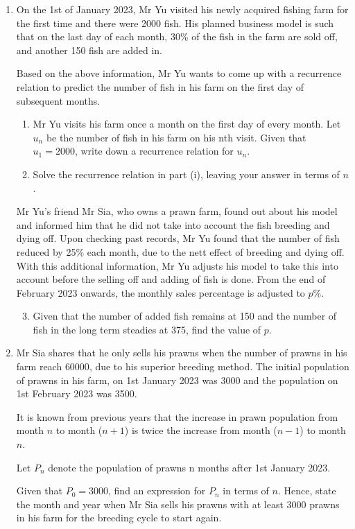 \documentclass{echw}
\begin{document}
    \problem{}
        \begin{enumerate}
            \item On the 1st of January 2023, Mr Yu visited his newly acquired fishing farm for the first time and there were 2000 fish. His planned business model is such that on the last day of
            each month, 30\% of the fish in the farm are sold off, and another 150 fish are added in.

            Based on the above information, Mr Yu wants to come up with a recurrence relation to predict the number of fish in his farm on the first day of subsequent months.

            \begin{enumerate}
                \item Mr Yu visits his farm once a month on the first day of every month. Let $u_n$ be the number of fish in his farm on his nth visit. Given that $u_1 = 2000$, write down a recurrence relation for $u_n$.
                \item Solve the recurrence relation in part (i), leaving your answer in terms of $n$.
            \end{enumerate}

            Mr Yu's friend Mr Sia, who owns a prawn farm, found out about his model and informed him that he did not take into account the fish breeding and dying off. Upon checking past records, Mr Yu found that the number of fish reduced by 25\% each month, due to the nett effect of breeding and dying off. With this additional information, Mr Yu adjusts his model to take this into account before the selling off and adding of fish is done. From the end of February 2023 onwards, the monthly sales percentage is adjusted to $p$\%.

            \begin{enumerate}
                \setcounter{enumii}{2}
                \item Given that the number of added fish remains at 150 and the number of fish in the long term steadies at 375, find the value of $p$.
            \end{enumerate}

            \item Mr Sia shares that he only sells his prawns when the number of prawns in his farm reach $60000$, due to his superior breeding method. The initial population of prawns in his farm, on 1st January 2023 was 3000 and the population on 1st February 2023 was 3500.
            
            It is known from previous years that the increase in prawn population from month $n$ to month ($n+1$) is twice the increase from month ($n-1$) to month $n$.

            Let $P_n$ denote the population of prawns n months after 1st January 2023.

            Given that $P_0 = 3000$, find an expression for $P_n$ in terms of $n$. Hence, state the month and year when Mr Sia sells his prawns with at least 3000 prawns in his farm for the breeding cycle to start again.
        \end{enumerate}
\end{document}
